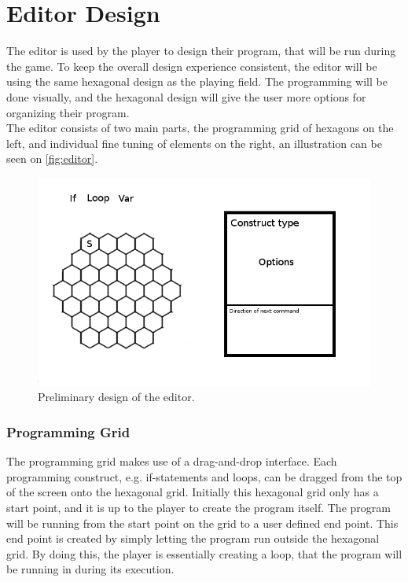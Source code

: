 \section{Editor Design}
The editor is used by the player to design their program, that will be run during the game. To keep the overall design experience consistent, the editor will be using the same hexagonal design as the playing field. The programming will be done visually, and the hexagonal design will give the user more options for organizing their program.\\

The editor consists of two main parts, the programming grid of hexagons on the left, and individual fine tuning of elements on the right, an illustration can be seen on \autoref{fig:editor}.

\begin{figure}[h]
\includegraphics[width=\textwidth]{img/editor.png}
\caption{Preliminary design of the editor.}
\label{fig:editor}
\end{figure}

\subsubsection*{Programming Grid}
The programming grid makes use of a drag-and-drop interface.
Each programming construct, e.g. if-statements and loops, can be dragged from the top of the screen onto the hexagonal grid.
Initially this hexagonal grid only has a start point, and it is up to the player to create the program itself.
The program will be running from the start point on the grid to a user defined end point.
This end point is created by simply letting the program run outside the hexagonal grid.
By doing this, the player is essentially creating a loop, that the program will be running in during its execution.\newline


